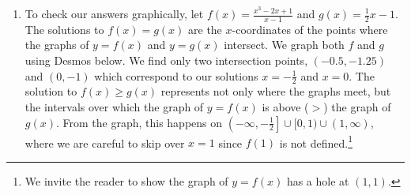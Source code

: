 \documentclass{ximera}
\begin{document}
\begin{example}
\begin{enumerate}
\begin{image}
\end{image}

We are interested in where $r(x) \geq 0$.  We see  $r(x) > 0$, or $(+)$, on the intervals $\left(-\infty, -\frac{1}{2}\right)$, $(0,1)$ and $(1, \infty)$.  We know $r(x) = 0$ when  $x = -\frac{1}{2}$ and $x = 0$.   Hence, $r(x) \geq 0$ on  $\left( - \infty, -\frac{1}{2} \right] \cup [0,1) \cup (1, \infty)$.

\item  To check our answers graphically,  let $f(x) = \frac{x^3-2x+1}{x-1}$ and $g(x) = \frac{1}{2} x -1$. The solutions to $f(x)=g(x)$ are the $x$-coordinates of the points where the graphs of $y=f(x)$ and $y=g(x)$ intersect.  We graph both $f$ and $g$ using Desmos below. We find only two intersection points, $(-0.5, -1.25)$ and $(0,-1)$ which correspond to our solutions $x = -\frac{1}{2}$ and $x = 0$.   The solution to $f(x) \geq g(x)$ represents not only where the graphs meet, but the intervals over which the graph of $y=f(x)$ is above ($>$) the graph of $g(x)$.  From the graph, this happens on $\left( - \infty, -\frac{1}{2} \right] \cup [0, 1) \cup (1, \infty)$, where we are careful to skip over $x=1$ since $f(1)$ is not defined.\footnote{We invite the reader to show the graph of $y=f(x)$ has a hole at $(1,1)$.}  


\begin{center} 
\end{center}

\end{enumerate}
\end{example}  
\end{document}
